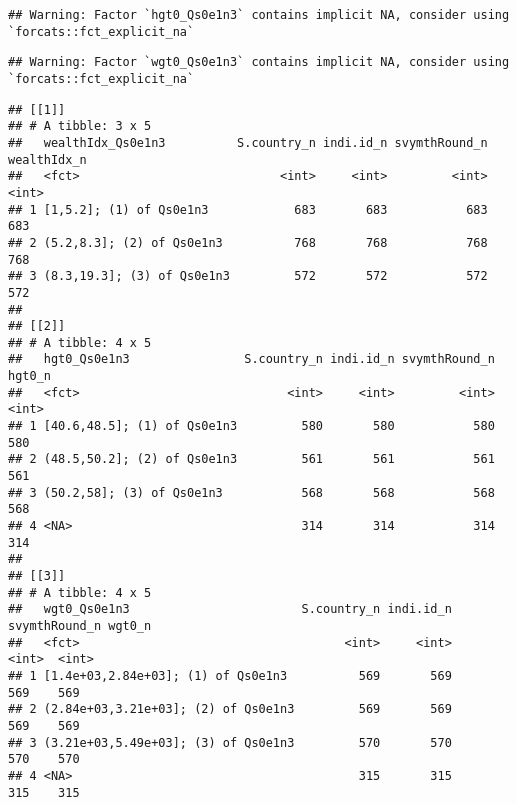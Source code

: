 \documentclass[
]{article}
\newenvironment{Shaded}{\begin{snugshade}}{\end{snugshade}}
\newcommand{\CommentTok}[1]{\textcolor[rgb]{0.56,0.35,0.01}{\textit{#1}}}
\newcommand{\DataTypeTok}[1]{\textcolor[rgb]{0.13,0.29,0.53}{#1}}
\newcommand{\KeywordTok}[1]{\textcolor[rgb]{0.13,0.29,0.53}{\textbf{#1}}}
\newcommand{\NormalTok}[1]{#1}
\newcommand{\OperatorTok}[1]{\textcolor[rgb]{0.81,0.36,0.00}{\textbf{#1}}}
\newcommand{\StringTok}[1]{\textcolor[rgb]{0.31,0.60,0.02}{#1}}
\begin{document}
\begin{Shaded}
\end{Shaded}

\begin{verbatim}
## Warning: Factor `hgt0_Qs0e1n3` contains implicit NA, consider using `forcats::fct_explicit_na`
\end{verbatim}

\begin{verbatim}
## Warning: Factor `wgt0_Qs0e1n3` contains implicit NA, consider using `forcats::fct_explicit_na`
\end{verbatim}

\begin{verbatim}
## [[1]]
## # A tibble: 3 x 5
##   wealthIdx_Qs0e1n3          S.country_n indi.id_n svymthRound_n wealthIdx_n
##   <fct>                            <int>     <int>         <int>       <int>
## 1 [1,5.2]; (1) of Qs0e1n3            683       683           683         683
## 2 (5.2,8.3]; (2) of Qs0e1n3          768       768           768         768
## 3 (8.3,19.3]; (3) of Qs0e1n3         572       572           572         572
## 
## [[2]]
## # A tibble: 4 x 5
##   hgt0_Qs0e1n3                S.country_n indi.id_n svymthRound_n hgt0_n
##   <fct>                             <int>     <int>         <int>  <int>
## 1 [40.6,48.5]; (1) of Qs0e1n3         580       580           580    580
## 2 (48.5,50.2]; (2) of Qs0e1n3         561       561           561    561
## 3 (50.2,58]; (3) of Qs0e1n3           568       568           568    568
## 4 <NA>                                314       314           314    314
## 
## [[3]]
## # A tibble: 4 x 5
##   wgt0_Qs0e1n3                        S.country_n indi.id_n svymthRound_n wgt0_n
##   <fct>                                     <int>     <int>         <int>  <int>
## 1 [1.4e+03,2.84e+03]; (1) of Qs0e1n3          569       569           569    569
## 2 (2.84e+03,3.21e+03]; (2) of Qs0e1n3         569       569           569    569
## 3 (3.21e+03,5.49e+03]; (3) of Qs0e1n3         570       570           570    570
## 4 <NA>                                        315       315           315    315
\end{verbatim}
\end{document}

